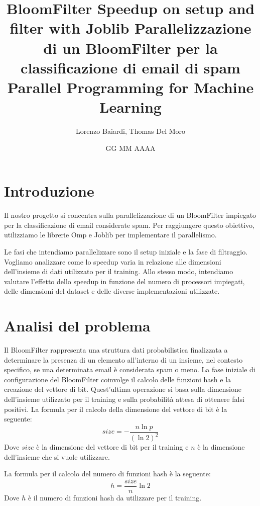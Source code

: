 \documentclass[11pt]{article}
\title{BloomFilter Speedup on setup and filter with Joblib}
\title{%
  Parallelizzazione di un BloomFilter per la classificazione di email di spam \\
  \large Parallel Programming for Machine Learning}
\author{Lorenzo Baiardi, Thomas Del Moro}
\date{GG MM AAAA}
\begin{document}
    \maketitle
    \clearpage

    \section{Introduzione}\label{sec:introduzione}
    Il nostro progetto si concentra sulla parallelizzazione di un BloomFilter impiegato per la classificazione di email considerate spam.
    Per raggiungere questo obiettivo, utilizziamo le librerie Omp e Joblib per implementare il parallelismo.

    Le fasi che intendiamo parallelizzare sono il setup iniziale e la fase di filtraggio.
    Vogliamo analizzare come lo speedup varia in relazione alle dimensioni dell'insieme di dati utilizzato per il training.
    Allo stesso modo, intendiamo valutare l'effetto dello speedup in funzione del numero di processori impiegati, delle dimensioni del dataset
    e delle diverse implementazioni utilizzate.

    \section{Analisi del problema}\label{sec:analisi-del-problema}
    Il BloomFilter rappresenta una struttura dati probabilistica finalizzata a determinare la presenza di un elemento all'interno di un insieme,
    nel contesto specifico, se una determinata email è considerata spam o meno.
    La fase iniziale di configurazione del BloomFilter coinvolge il calcolo delle funzioni hash e la creazione del vettore di bit.
    Quest'ultima operazione si basa sulla dimensione dell'insieme utilizzato per il training e sulla probabilità attesa di ottenere falsi positivi.
    La formula per il calcolo della dimensione del vettore di bit è la seguente:
    \begin{equation}
        size = -\frac{n \ln{p}}{(\ln{2})^2}\label{eq:dim_bit}
    \end{equation}
    Dove $size$ è la dimensione del vettore di bit per il training e $n$ è la dimensione dell'insieme che si vuole utilizzare.

    La formula per il calcolo del numero di funzioni hash è la seguente:
    \begin{equation}
        h = \frac{size}{n} \ln{2}\label{eq:num_hash}
    \end{equation}
    Dove $h$ è il numero di funzioni hash da utilizzare per il training.
\end{document}
